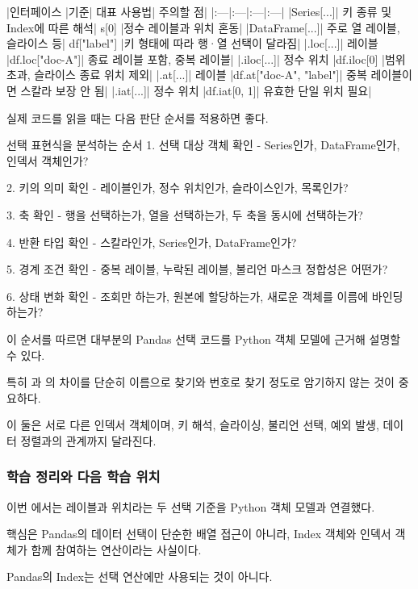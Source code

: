 \begin{dhktable}
|인터페이스	|기준|	대표 사용법|	주의할 점|
|:---|:---|:---|:---|
|Series[...]|	키 종류 및 Index에 따른 해석|	s[0]	|정수 레이블과 위치 혼동|
|DataFrame[...]|	주로 열 레이블, 슬라이스 등|	df["label"]	|키 형태에 따라 행·열 선택이 달라짐|
|.loc[...]|	레이블	|df.loc["doc-A"]|	종료 레이블 포함, 중복 레이블|
|.iloc[...]|	정수 위치	|df.iloc[0]	|범위 초과, 슬라이스 종료 위치 제외|
|.at[...]|	레이블	|df.at["doc-A", "label"]|	중복 레이블이면 스칼라 보장 안 됨|
|.iat[...]|	정수 위치	|df.iat[0, 1]|	유효한 단일 위치 필요|
\end{dhktable}

실제 코드를 읽을 때는 다음 판단 순서를 적용하면 좋다.

\begin{dhksmry}
선택 표현식을 분석하는 순서
1. 선택 대상 객체 확인
   - Series인가, DataFrame인가, 인덱서 객체인가?

2. 키의 의미 확인
   - 레이블인가, 정수 위치인가, 슬라이스인가, 목록인가?

3. 축 확인
   - 행을 선택하는가, 열을 선택하는가, 두 축을 동시에 선택하는가?

4. 반환 타입 확인
   - 스칼라인가, Series인가, DataFrame인가?

5. 경계 조건 확인
   - 중복 레이블, 누락된 레이블, 불리언 마스크 정합성은 어떤가?

6. 상태 변화 확인
   - 조회만 하는가, 원본에 할당하는가, 새로운 객체를 이름에 바인딩하는가?
\end{dhksmry}

이 순서를 따르면 대부분의 Pandas 선택 코드를 Python 객체 모델에 근거해 설명할 수 있다.

특히 과 의 차이를 단순히 이름으로 찾기와 번호로 찾기 정도로 암기하지 않는 것이 중요하다.

이 둘은 서로 다른 인덱서 객체이며, 키 해석, 슬라이싱, 불리언 선택, 예외 발생, 데이터 정렬과의 관계까지 달라진다.

\subsubsection{학습 정리와 다음 학습 위치}

이번 에서는 레이블과 위치라는 두 선택 기준을 Python 객체 모델과 연결했다.

핵심은 Pandas의 데이터 선택이 단순한 배열 접근이 아니라, Index 객체와 인덱서 객체가 함께 참여하는 연산이라는 사실이다.

Pandas의 Index는 선택 연산에만 사용되는 것이 아니다.

